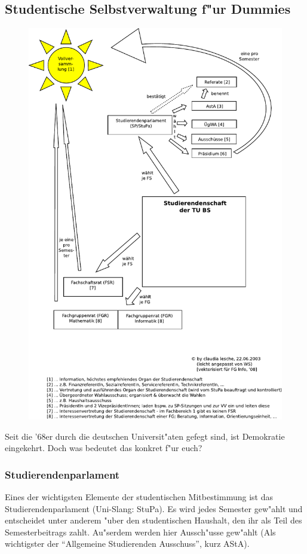 \subsection{Studentische Selbstverwaltung f"ur Dummies}

\begin{figure}[b]
  \centering\includegraphics[width=\textwidth]{bilder/gremienkunde.pdf}
\end{figure}

Seit die '68er durch die deutschen Universit"aten gefegt sind, 
ist Demokratie eingekehrt.
Doch was bedeutet das konkret f"ur euch?

\subsubsection*{Studierendenparlament}
Eines der wichtigsten Elemente der studentischen Mitbestimmung 
ist das Studierendenparlament (Uni-Slang: StuPa).
Es wird jedes Semester gew"ahlt und entscheidet unter anderem 
"uber den studentischen Haushalt, den ihr als Teil des Semesterbeitrags 
zahlt. Au"serdem werden hier Aussch"usse gew"ahlt (Als wichtigster 
der "`Allgemeine Studierenden Ausschuss"', kurz AStA).

